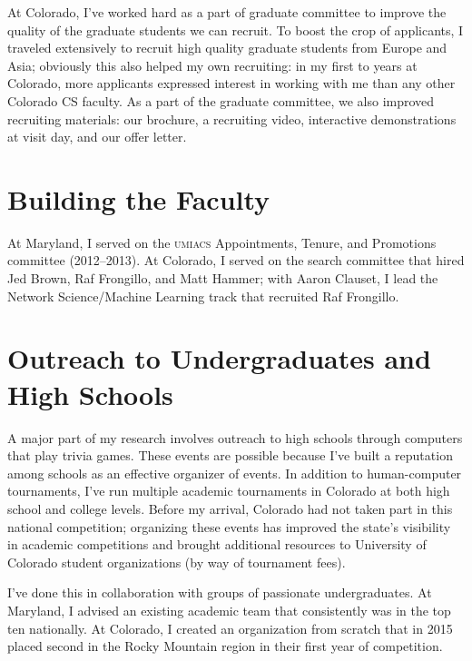 \documentclass[11pt]{amsart}
\newcommand{\abr}[1]{\textsc{#1}}
\begin{document}
At Colorado, I've worked hard as a part of graduate committee to improve the
quality of the graduate students we can recruit.  To boost the crop of
applicants, I traveled extensively to recruit high quality graduate students
from Europe and Asia; obviously this also helped my own recruiting: in my first
to years at Colorado, more applicants expressed interest in working with me than
any other Colorado CS faculty.  As a part of the graduate committee, we
also improved recruiting materials: our brochure, a recruiting video,
interactive demonstrations at visit day, and our offer letter.

\section{Building the Faculty}

At Maryland, I served on the \abr{umiacs} Appointments, Tenure, and Promotions
committee (2012--2013).  At Colorado, I served on the search committee that
hired Jed Brown, Raf Frongillo, and Matt Hammer; with Aaron Clauset, I lead the
Network Science/Machine Learning track that recruited Raf Frongillo.


\section{Outreach to Undergraduates and High Schools}


A major part of my research involves outreach to high schools through computers
that play trivia games.  These events are possible because I've built a
reputation among schools as an effective organizer of events.  In addition to
human-computer tournaments, I've run multiple academic tournaments in Colorado
at both high school and college levels.  Before my arrival, Colorado had not
taken part in this national competition; organizing these events has improved
the state's visibility in academic competitions and brought additional resources
to University of Colorado student organizations (by way of tournament fees).

I've done this in collaboration with groups of passionate
undergraduates.  At Maryland, I advised an existing academic team that
consistently was in the top ten nationally.  At Colorado, I created an
organization from scratch that in 2015 placed second in the Rocky
Mountain region in their first year of competition.


%
%
\end{document}
